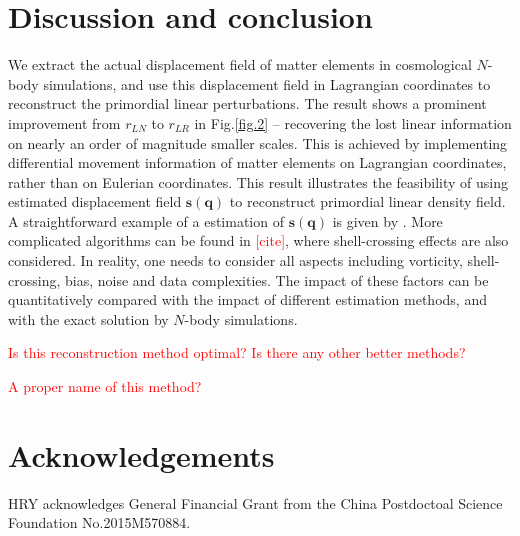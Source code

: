 \documentclass[aps,prd,twocolumn,superscriptaddress,amsfont,amssymb,amsmath,nofootinbib,showpacs,balancelastpage]{revtex4-1}
\newcommand{\bs}{\boldsymbol}
\newcommand{\tcr}{\textcolor{red}}
\begin{document}
\section{Discussion and conclusion}\label{sec.discussion}
We extract the actual displacement field of matter elements in cosmological $N$-body
simulations, and use this displacement field in Lagrangian coordinates to reconstruct
the primordial linear perturbations. The result shows a prominent improvement from
$r_{LN}$ to $r_{LR}$ in Fig.\ref{fig.2} -- recovering the lost linear information on
nearly an order of magnitude smaller scales.
This is achieved by implementing differential movement information
of matter elements on Lagrangian coordinates, rather than on
Eulerian coordinates. This result illustrates the feasibility
of using estimated displacement field $\bs s(\bs q)$ to reconstruct primordial linear
density field. A straightforward example of a estimation of $\bs s(\bs q)$
is given by \cite{1995ApJS..100..269P,1998ApJS..115...19P}.
More complicated algorithms can be found in \tcr{[cite]}, where
shell-crossing effects are also considered. In reality, one needs
to consider all aspects including vorticity, shell-crossing, bias, noise
and data complexities. The impact of these factors can be quantitatively
compared with the impact of different estimation methods, and with
the exact solution by $N$-body simulations.

\tcr{Is this reconstruction method optimal? Is there any other better methods?}

\tcr{A proper name of this method?}

\section*{Acknowledgements}
HRY acknowledges General Financial Grant from the China Postdoctoal Science Foundation No.2015M570884.

%


\end{document}
